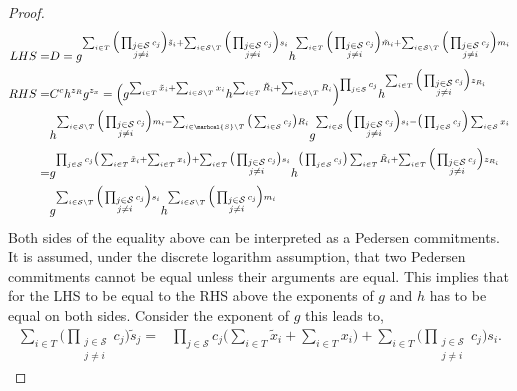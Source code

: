 \begin{proof}
\begin{align*}
LHS =& D = g ^ {\sum_{i\in T } \Big(\prod_{\substack{j\in\mathcal{S}\\ j\neq i}}   c_j \Big)\tilde{s}_i + \sum_{i\in\mathcal{S}\backslash T } \Big(\prod_{\substack{j\in\mathcal{S}\\ j\neq i}}   c_j \Big)s_i} h^ {\sum_{i\in T } \Big(\prod_{\substack{j\in\mathcal{S}\\ j\neq i}}    c_j \Big)\tilde{m}_i+ \sum_{i\in\mathcal{S}\backslash T} \Big(\prod_{\substack{j\in\mathcal{S}\\ j\neq i}}    c_j \Big)m_i} 
 \\
RHS =& C^ch^{z_R}g^{z_x} =   \Big( g^{\sum_{i\in T} \tilde{x}_i + \sum_{i\in \mathcal{S}\backslash T} x_i} h^{\sum_{i\in T} \tilde{R}_i + \sum_{i\in \mathcal{S}\backslash T} R_i}  \Big) ^{\prod_{j\in\mathcal{S}} c_j}  h^{ \sum_{i\in T } \Big( \prod_{\substack{j\in\mathcal{S}\\ j\neq i}} c_j \Big) z_{R_i}}
 \\
& h^{\sum_{i\in\mathcal{S}\backslash T } \Big( \prod_{\substack{j\in\mathcal{S}\\ j\neq i}}   c_j \Big)m_i- \sum_{i\in\marhcal{S}\backslash T} \big( \sum_{i\in\mathcal{S}} c_j\big)R_i}  
g^{ \sum_{i\in\mathcal{S}} \Big( \prod_{\substack{j\in\mathcal{S}\\ j\neq i}}   c_j \Big)s_i - \big( \prod_{j\in\mathcal{S}} c_j \Big) \sum_{i\in\mathcal{S}} x_i}
\\ 
 =&  g ^{\prod_{j\in\mathcal{S}} c_j \big(\sum_{i\in T} \tilde{x}_i + \sum_{i\in T} x_i\big) +  \sum_{i\in T} \big( \prod_{\substack{j\in\mathcal{S}\\ j\neq i}} c_j\big) s_i     } h^{ \big( \prod_{j\in\mathcal{S}} c_j\big)\sum_{i\in T} \tilde{R}_i  + \sum_{i\in T } \Big( \prod_{\substack{j\in\mathcal{S}\\ j\neq i}} c_j \Big) z_{R_i}}
 \\
 & g ^ {\sum_{i\in\mathcal{S}\backslash T } \Big(\prod_{\substack{j\in\mathcal{S}\\ j\neq i}}   c_j \Big)s_i} h^ { \sum_{i\in\mathcal{S}\backslash T} \Big(\prod_{\substack{j\in\mathcal{S}\\ j\neq i}}    c_j \Big)m_i} 
\end{align*}
Both sides of the equality above can be interpreted as a Pedersen commitments.  It is assumed, under the discrete logarithm assumption, that two Pedersen commitments cannot be equal unless their arguments are equal. This implies that for the LHS to be equal to the RHS above the exponents of $g$ and $h$ has to be equal on both sides. Consider the exponent of $g$ this leads to,
\begin{align}
\label{eq:cheatingCient}
\sum_{i\in T} \big(\prod_{\substack{j\in\mathcal{S}\\ j\neq i}} c_j \big) \tilde{s}_j =& \prod_{j\in\mathcal{S}} c_j \big(\sum_{i\in T} \tilde{x}_i + \sum_{i\in T} x_i\big) + \sum_{i\in T} \big( \prod_{\substack{j\in\mathcal{S}\\ j\neq i}} c_j\big) s_i  . 
\end{align}


\end{proof}
